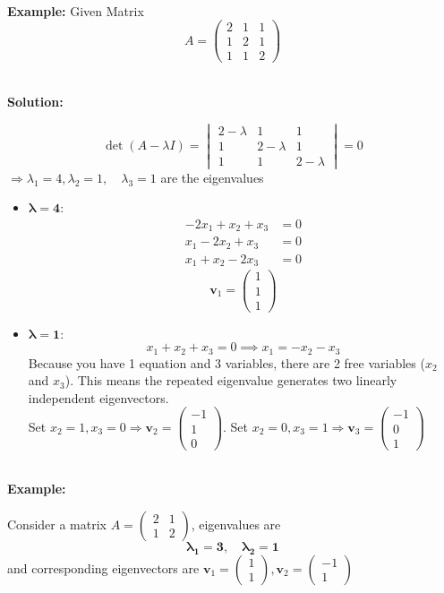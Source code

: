 \documentclass[DIV=20,oneside]{scrartcl}
\newcommand{\solution}{
	\noindent\textbf{\\Solution: }
}
\newcommand{\example}{
	\noindent\textbf{\\Example: }
}
\begin{document}
\begin{itemize}
	\example Given Matrix$$A = \begin{pmatrix} 2 & 1 & 1 \\ 1 & 2 & 1 \\ 1 & 1 & 2 \end{pmatrix}$$
	\solution
	$$\det(A - \lambda I) = \begin{vmatrix} 2-\lambda & 1 & 1 \\ 1 & 2-\lambda & 1 \\ 1 & 1 & 2-\lambda \end{vmatrix} = 0$$
	$\Rightarrow \lambda_1 = 4, \lambda_2 = 1, \quad \lambda_3 = 1$ are the eigenvalues
	\begin{itemize}
		\item[$\bullet$] $\mathbf{\lambda = 4:} $ \\
		$$\begin{aligned} -2x_1 + x_2 + x_3 &= 0 \\ x_1 - 2x_2 + x_3 &= 0 \\ x_1 + x_2 - 2x_3 &= 0 \end{aligned}$$
		$$\mathbf{v}_1 = \begin{pmatrix} 1 \\ 1 \\ 1 \end{pmatrix}$$
		\item[$\bullet$] $\mathbf{\lambda = 1:}$\\
		$$x_1 + x_2 + x_3 = 0 \implies x_1 = -x_2 - x_3$$
		Because you have 1 equation and 3 variables, there are 2 free variables ($x_2$ and $x_3$). This means the repeated eigenvalue generates two linearly independent eigenvectors.\\
		Set $x_2 = 1, x_3 = 0 \Rightarrow \mathbf{v}_2 = \begin{pmatrix} -1 \\ 1 \\ 0 \end{pmatrix}$. 
		Set $x_2 = 0, x_3 = 1 \Rightarrow \mathbf{v}_3 = \begin{pmatrix} -1 \\ 0 \\ 1 \end{pmatrix}$		
	\end{itemize}
	\example 
	Consider a matrix $A = \begin{pmatrix} 2 & 1 \\ 1 & 2 \end{pmatrix}$, eigenvalues are $$\mathbf{\lambda_1 = 3}, \quad \mathbf{\lambda_2 = 1}$$ and corresponding eigenvectors are 
	$ \mathbf{v}_1 = \begin{pmatrix} 1 \\ 1 \end{pmatrix},\mathbf{v}_2 = \begin{pmatrix} -1 \\ 1 \end{pmatrix} $

\end{itemize}
\end{document}
